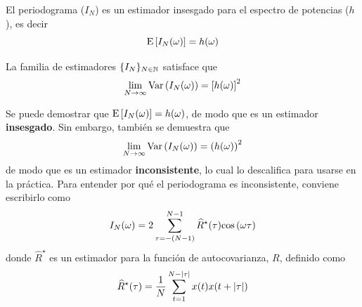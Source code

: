 \begin{proposicion}
El periodograma ($I_N$) es un estimador insesgado para el espectro de potencias ($h$), es decir
\begin{equation}
\mathrm{E}\left[ I_N(\omega) \right] = h(\omega)
\end{equation}
\end{proposicion}

\begin{proposicion}
La familia de estimadores $\{I_N\}_{N\in\mathbb{N}}$ satisface que
\begin{equation}
\lim_{N\rightarrow \infty} \mathrm{Var}\left( I_N(\omega) \right) = \left[ h(\omega) \right]^{2}
\end{equation}
\end{proposicion}


Se puede demostrar que $\mathrm{E}\left[ I_N(\omega) \right] = h(\omega)$, de modo que es un estimador 
\textbf{insesgado}. Sin embargo, también se demuestra que
\begin{equation*}
\lim_{N\rightarrow \infty} \mathrm{Var}\left( I_N(\omega) \right) = \left( h(\omega) \right)^{2}
\end{equation*}
de modo que es un estimador \textbf{inconsistente}, lo cual lo descalifica para usarse en la 
práctica.
%
Para entender por qué el periodograma es inconsistente, conviene escribirlo como
\begin{equation}
I_N(\omega) = 2 \sum_{\tau = -(N-1)}^{N-1} \widehat{R}^{\star}(\tau) \mathrm{cos}\left( \omega \tau \right)
\label{txt_periodograma2}
\end{equation}
%
donde $\widehat{R}^{\star}$ es un estimador para la función de autocovarianza, $R$, definido como
\begin{equation}
\widehat{R}^{\star} (\tau) = \frac{1}{N} \sum_{t = 1}^{N-\left| \tau \right|} x(t) x(t+\left| \tau \right|)
\end{equation}

